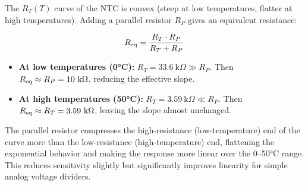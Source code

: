 \begin{solutionblock}
The $R_T(T)$ curve of the NTC is convex (steep at low temperatures, flatter at high temperatures). Adding a parallel resistor $R_P$ gives an equivalent resistance:

\[
R_{\rm eq} = \frac{R_T \cdot R_P}{R_T + R_P}
\]

\begin{itemize}
    \item \textbf{At low temperatures (0°C):} $R_T = 33.6~\text{k}\Omega \gg R_P$. Then $R_{\rm eq} \approx R_P = 10~\text{k}\Omega$, reducing the effective slope.
    \item \textbf{At high temperatures (50°C):} $R_T = 3.59~\text{k}\Omega \ll R_P$. Then $R_{\rm eq} \approx R_T = 3.59~\text{k}\Omega$, leaving the slope almost unchanged.
\end{itemize}

The parallel resistor compresses the high-resistance (low-temperature) end of the curve more than the low-resistance (high-temperature) end, flattening the exponential behavior and making the response more linear over the 0–50°C range. This reduces sensitivity slightly but significantly improves linearity for simple analog voltage dividers.
\end{solutionblock}

